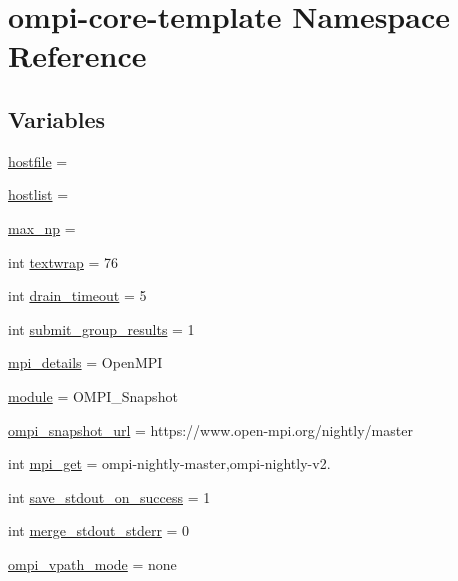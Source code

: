 \hypertarget{namespaceompi-core-template}{\section{ompi-\/core-\/template Namespace Reference}
\label{namespaceompi-core-template}
}
\subsection*{Variables}
\begin{DoxyCompactItemize}
\item 
\hyperlink{namespaceompi-core-template_aed8287cfdf838bf38fe4e39ae97c2e9c}{hostfile} =
\item 
\hyperlink{namespaceompi-core-template_a398a79c984b3635ab67f829c9865510e}{hostlist} =
\item 
\hyperlink{namespaceompi-core-template_aef06f55877b195b98c9e7e6689f18064}{max\-\_\-np} =
\item 
int \hyperlink{namespaceompi-core-template_aeb49f8ad6e70070ee42d28d172cf2055}{textwrap} = 76
\item 
int \hyperlink{namespaceompi-core-template_a9b0a0d844979f7c5b1aa019aa4ddf2f1}{drain\-\_\-timeout} = 5
\item 
int \hyperlink{namespaceompi-core-template_ad901c84f6aa10668dc9e69ba586dfbf4}{submit\-\_\-group\-\_\-results} = 1
\item 
\hyperlink{namespaceompi-core-template_ae991e705825a3a258264eba6c0aecc15}{mpi\-\_\-details} = Open\-M\-P\-I
\item 
\hyperlink{namespaceompi-core-template_a0740abf47d69d62e964af74e156b0e88}{module} = O\-M\-P\-I\-\_\-\-Snapshot
\item 
\hyperlink{namespaceompi-core-template_a931771a1ede0f79aca611cdb2d669fee}{ompi\-\_\-snapshot\-\_\-url} = https\-://www.\-open-\/mpi.\-org/nightly/master
\item 
int \hyperlink{namespaceompi-core-template_a2a9de4b31652c233bacb61b1fd294c34}{mpi\-\_\-get} = ompi-\/nightly-\/master,ompi-\/nightly-\/v2.
\item 
int \hyperlink{namespaceompi-core-template_a5c4b457cac4bfd0c265d8e85f6ad4d30}{save\-\_\-stdout\-\_\-on\-\_\-success} = 1
\item 
int \hyperlink{namespaceompi-core-template_aa5933d429ca66125d5d2ae8d0c6a1228}{merge\-\_\-stdout\-\_\-stderr} = 0
\item 
\hyperlink{namespaceompi-core-template_a59d3abf6ca7c94e790fd49325d3701f0}{ompi\-\_\-vpath\-\_\-mode} = none

\end{DoxyCompactItemize}
